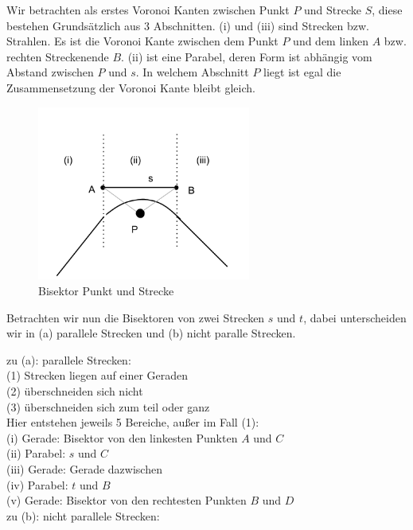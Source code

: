 Wir betrachten als erstes Voronoi Kanten zwischen Punkt $P$ und Strecke $S$, diese bestehen Grundsätzlich aus 3 Abschnitten. (i) und (iii) sind Strecken bzw. Strahlen. Es ist die Voronoi Kante zwischen dem Punkt $P$ und dem linken $A$ bzw. rechten Streckenende $B$. (ii) ist eine Parabel, deren Form ist abhängig vom Abstand zwischen $P$ und $s$. In welchem Abschnitt $P$ liegt ist egal die Zusammensetzung der Voronoi Kante bleibt gleich.

\begin{figure}[h]
\begin{center}
\includegraphics[width=7cm]{img/punkt-strecke.png}
\end{center}
\caption{Bisektor Punkt und Strecke}
\label{fig:c1}
\end{figure}


Betrachten wir nun die Bisektoren von zwei Strecken $s$ und $t$, dabei unterscheiden wir in (a) parallele Strecken und (b) nicht paralle Strecken.

zu (a): parallele Strecken:\\

(1) Strecken liegen auf einer Geraden\\
(2) überschneiden sich nicht\\
(3) überschneiden sich zum teil oder ganz\\

Hier entstehen jeweils 5 Bereiche, außer im Fall (1):\\
(i) Gerade: Bisektor von den linkesten Punkten $A$ und $C$\\
(ii) Parabel: $s$ und $C$\\
(iii) Gerade: Gerade dazwischen\\
(iv) Parabel: $t$ und $B$\\
(v) Gerade: Bisektor von den rechtesten Punkten $B$ und $D$\\

zu (b): nicht parallele Strecken:\\

